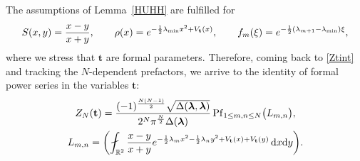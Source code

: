 \documentclass[11pt]{article}
\numberwithin{equation}{section}
\numberwithin{equation}{section}
\newcommand{\dd}{\mathrm{d}}
\begin{document}
The assumptions of Lemma~\ref{HUHH} are fulfilled for
\[
S(x,y) = \frac{x - y}{x + y},\qquad \rho(x) = {\rm e}^{-\frac{1}{2}\lambda_{\min} x^2 + V_{\mathbf{t}}(x)},\qquad f_m(\xi) = {\rm e}^{-\frac{1}{2}(\lambda_{m+1} - \lambda_{\min})\xi},
\]
where we stress that $\mathbf{t}$ are formal parameters. Therefore, coming back to \eqref{Ztint} and tracking the $N$-dependent prefactors, we arrive to the identity of formal power series in the variables $\mathbf{t}$:
\begin{gather*}
Z_N(\mathbf{t}) = \frac{(-1)^{\frac{N(N - 1)}{2}} \sqrt{\Delta(\boldsymbol{\lambda},\boldsymbol{\lambda})}}{2^N \pi^{\frac{N}{2}} \Delta(\boldsymbol{\lambda})} \operatorname{Pf}_{1 \leq m,n \leq N} \bigl(L_{m,n}\bigr), \\
L_{m,n} = \biggl(\fint_{\mathbb{R}^2} \frac{x - y}{x + y} {\rm e}^{-\frac{1}{2}\lambda_m x^2 - \frac{1}{2}\lambda_n y^2 + V_{\mathbf{t}}(x) + V_{\mathbf{t}}(y)} \,\dd x \dd y\biggr).%
\end{gather*}
\end{document}
